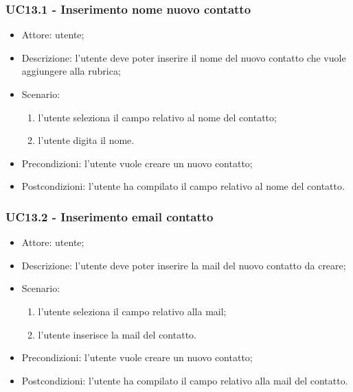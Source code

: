 \subsubsection{UC13.1 - Inserimento nome nuovo contatto} \label{sec: UC13.1}
\begin{itemize}
    \item Attore: utente;
    \item Descrizione: l'utente deve poter inserire il nome del nuovo contatto che vuole aggiungere alla rubrica;
    \item Scenario:
        \begin{enumerate}
        \item l'utente seleziona il campo relativo al nome del contatto;
        \item l'utente digita il nome.
        \end{enumerate}
    
    \item Precondizioni: l'utente vuole creare un nuovo contatto;
    \item Postcondizioni: l'utente ha compilato il campo relativo al nome del contatto.
\end{itemize}


\subsubsection{UC13.2 - Inserimento email contatto} \label{sec: UC13.2}
\begin{itemize}
    \item Attore: utente;
    \item Descrizione: l'utente deve poter inserire la mail del nuovo contatto da creare;
    \item Scenario:
        \begin{enumerate}
        \item l'utente seleziona il campo relativo alla mail;
        \item l'utente inserisce la mail del contatto.
        \end{enumerate}
    
    \item Precondizioni: l'utente vuole creare un nuovo contatto;
    \item Postcondizioni: l'utente ha compilato il campo relativo alla mail del contatto.
\end{itemize}


